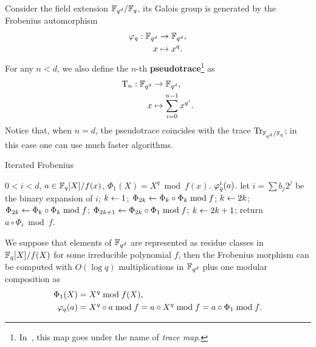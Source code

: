 Consider the field extension $\mathbb{F}_{q^d}/\mathbb{F}_q$, its Galois group is
generated by the Frobenius automorphism
\begin{equation}
  \label{eq:199}
  \begin{aligned}
  \varphi_q : \mathbb{F}_{q^d}&\rightarrow\mathbb{F}_{q^d}\text{,}\\
  x &\mapsto x^{q}\text{.}
  \end{aligned}
\end{equation}
For any $n<d$, we also define the $n$-th
\textbf{pseudotrace}\footnote{In~\cite{vzgathen+shoup92},
  this map goes under the name of \emph{trace map}.}
as
\begin{equation}
  \label{eq:202}
  \begin{aligned}
    \operatorname{T}_n : \mathbb{F}_{q^d}&\rightarrow\mathbb{F}_{q^d}\text{,}\\
    x&\mapsto\sum_{i=0}^{n-1} x^{q^i}\text{.}
  \end{aligned}
\end{equation}
Notice that, when $n=d$, the pseudotrace coincides with the trace
$\operatorname{Tr}_{\mathbb{F}_{q^d}/\mathbb{F}_q}$; in this case one can use much faster
algorithms.


\begin{algorithm}
  \label{alg:itfrob}
  \caption{Iterated Frobenius}
  \begin{algorithmic}[1]
    \REQUIRE $0<i<d$, $a\in\mathbb{F}_q[X]/f(x)$, $\Phi_1(X) = X^q\bmod f(x)$.
    \ENSURE $\varphi_q^i(a)$.
    \STATE let $i=\sum b_j2^j$ be the binary expansion of $i$;
    \STATE $k \leftarrow 1$;
    \STATE $\Phi_{2k} \leftarrow \Phi_k\circ\Phi_k \bmod f$;
    \STATE $k \leftarrow 2k$;
    \ELSE
    \STATE $\Phi_{2k} \leftarrow \Phi_k\circ\Phi_k \bmod f$;
    \STATE $\Phi_{2k+1} \leftarrow \Phi_{2k}\circ\Phi_1 \bmod f$;
    \STATE $k \leftarrow 2k +1$;
    \ENDIF
    \ENDFOR
    \STATE return $a\circ\Phi_i \bmod f$.
  \end{algorithmic}
\end{algorithm}

We suppose that elements of $\mathbb{F}_{q^d}$ are represented as residue
classes in $\mathbb{F}_q[X]/f(X)$ for some irreducible polynomial $f$, then
the Frobenius morphism can be computed with $O(\log q)$
multiplications in $\mathbb{F}_{q^d}$ plus one modular composition as
\begin{align}
  \label{eq:203}
  \Phi_1(X) &= X^q \bmod f(X)\text{,}\\
  \varphi_q(a) &= X^q\circ a\bmod f = a\circ X^q\bmod f = a\circ \Phi_1\bmod f
  \text{.}
\end{align}



